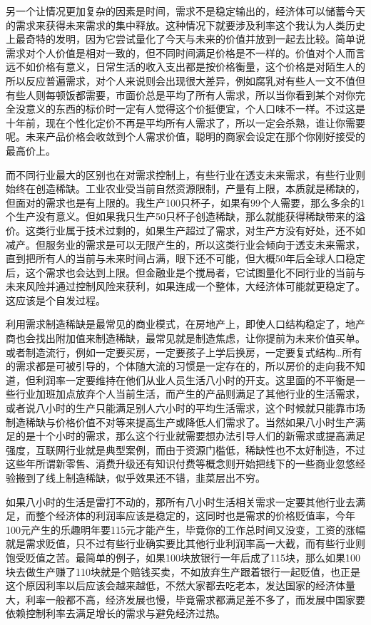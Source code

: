 \documentclass[
  letterpaper,
  DIV=11,
  numbers=noendperiod]{scrreprt}
\begin{document}
另一个让情况更加复杂的因素是时间，需求不是稳定输出的，经济体可以储蓄今天的需求来获得未来需求的集中释放。这种情况下就要涉及利率这个我认为人类历史上最奇特的发明，因为它尝试量化了今天与未来的价值并放到一起去比较。简单说需求对个人价值是相对一致的，但不同时间满足价格是不一样的。价值对个人而言远不如价格有意义，日常生活的收入支出都是按价格衡量，这个价格是对陌生人的所以反应普遍需求，对个人来说则会出现很大差异，例如腐乳对有些人一文不值但有些人则每顿饭都需要，市面价总是平均了所有人需求，所以当你看到某个对你完全没意义的东西的标价时一定有人觉得这个价挺便宜，个人口味不一样。不过这是十年前，现在个性化定价不再是平均所有人需求了，所以一定会杀熟，谁让你需要呢。未来产品价格会收敛到个人需求价值，聪明的商家会设定在那个你刚好接受的最高价上。

而不同行业最大的区别也在对需求控制上，有些行业在透支未来需求，有些行业则始终在创造稀缺。工业农业受当前自然资源限制，产量有上限，本质就是稀缺的，但面对的需求也是有上限的。我生产100只杯子，如果有99个人需要，那么多余的1个生产没有意义。但如果我只生产50只杯子创造稀缺，那么就能获得稀缺带来的溢价。这类行业属于技术过剩的，如果生产超过了需求，对生产方没有好处，还不如减产。但服务业的需求是可以无限产生的，所以这类行业会倾向于透支未来需求，直到把所有人的当前与未来时间占满，眼下还不可能，但大概50年后全球人口稳定后，这个需求也会达到上限。但金融业是个搅局者，它试图量化不同行业的当前与未来风险并通过控制风险来获利，如果连成一个整体，大经济体可能就更稳定了。这应该是个自发过程。

利用需求制造稀缺是最常见的商业模式，在房地产上，即使人口结构稳定了，地产商也会找出附加值来制造稀缺，最常见就是制造焦虑，让你提前为未来价值买单。或者制造流行，例如一定要买房，一定要孩子上学后换房，一定要复式结构\ldots 所有的需求都是可被引导的，个体随大流的习惯是一定存在的，所以房价的走向我不知道，但利润率一定要维持在他们从业人员生活八小时的开支。这里面的不平衡是一些行业加班加点放弃个人当前生活，而产生的产品则满足了其他行业的生活需求，或者说八小时的生产只能满足别人六小时的平均生活需求，这个时候就只能靠市场制造稀缺与价格价值不对等来提高生产或降低人们需求了。当然如果八小时生产满足的是十个小时的需求，那么这个行业就需要想办法引导人们的新需求或提高满足强度，互联网行业就是典型案例，而由于资源门槛低，稀缺性也不太好制造，不过这些年所谓新零售、消费升级还有知识付费等概念则开始把线下的一些商业忽悠经验搬到了线上制造稀缺，似乎效果还不错，韭菜层出不穷。

如果八小时的生活是雷打不动的，那所有八小时生活相关需求一定要其他行业去满足，而整个经济体的利润率应该是稳定的，这同时也是需求的价格贬值率，今年100元产生的乐趣明年要115元才能产生，毕竟你的工作总时间又没变，工资的涨幅就是需求贬值，只不过有些行业确实要比其他行业利润率高一大截，而有些行业则饱受贬值之苦。最简单的例子，如果100块放银行一年后成了115块，那么如果100块去做生产赚了110块就是个赔钱买卖，不如放弃生产跟着银行一起贬值，也正是这个原因利率以后应该会越来越低，不然大家都去吃老本，发达国家的经济体量大，利率一般都不高，经济发展也慢，毕竟需求都满足差不多了，而发展中国家要依赖控制利率去满足增长的需求与避免经济过热。
\end{document}
